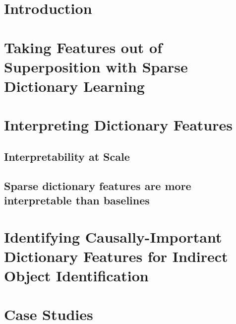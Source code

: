 \documentclass{article} %
\begin{document}
\section{Introduction}


\section{Taking Features out of Superposition with Sparse Dictionary Learning}
\label{section:dictionary_learning}


\section{Interpreting Dictionary Features}
\label{section:autointerp}
\subsection{Interpretability at Scale}
\label{section:autointerp_background}


\subsection{Sparse dictionary features are more interpretable than baselines}
\label{subsection:interpretability_baselines}

\section{Identifying Causally-Important Dictionary Features for Indirect Object Identification}
\label{section:identifying_causal_features}


\section{Case Studies}

\label{section:case_studies}
\end{document}
